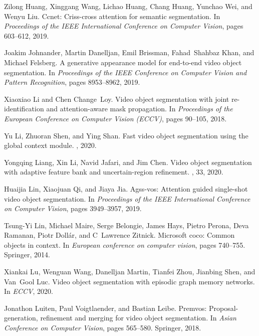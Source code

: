 \documentclass[final]{cvpr}
\begin{document}
{\begin{thebibliography}{10}
Zilong Huang, Xinggang Wang, Lichao Huang, Chang Huang, Yunchao Wei, and Wenyu
  Liu.
\newblock Ccnet: Criss-cross attention for semantic segmentation.
\newblock In {\em Proceedings of the IEEE International Conference on Computer
  Vision}, pages 603--612, 2019.

Joakim Johnander, Martin Danelljan, Emil Brissman, Fahad~Shahbaz Khan, and
  Michael Felsberg.
\newblock A generative appearance model for end-to-end video object
  segmentation.
\newblock In {\em Proceedings of the IEEE Conference on Computer Vision and
  Pattern Recognition}, pages 8953--8962, 2019.

Xiaoxiao Li and Chen Change~Loy.
\newblock Video object segmentation with joint re-identification and
  attention-aware mask propagation.
\newblock In {\em Proceedings of the European Conference on Computer Vision
  (ECCV)}, pages 90--105, 2018.

Yu Li, Zhuoran Shen, and Ying Shan.
\newblock Fast video object segmentation using the global context module.
, 2020.

Yongqing Liang, Xin Li, Navid Jafari, and Jim Chen.
\newblock Video object segmentation with adaptive feature bank and
  uncertain-region refinement.
, 33, 2020.

Huaijia Lin, Xiaojuan Qi, and Jiaya Jia.
\newblock Agss-vos: Attention guided single-shot video object segmentation.
\newblock In {\em Proceedings of the IEEE International Conference on Computer
  Vision}, pages 3949--3957, 2019.

Tsung-Yi Lin, Michael Maire, Serge Belongie, James Hays, Pietro Perona, Deva
  Ramanan, Piotr Doll{\'a}r, and C~Lawrence Zitnick.
\newblock Microsoft coco: Common objects in context.
\newblock In {\em European conference on computer vision}, pages 740--755.
  Springer, 2014.

Xiankai Lu, Wenguan Wang, Danelljan Martin, Tianfei Zhou, Jianbing Shen, and
  Van~Gool Luc.
\newblock Video object segmentation with episodic graph memory networks.
\newblock In {\em ECCV}, 2020.

Jonathon Luiten, Paul Voigtlaender, and Bastian Leibe.
\newblock Premvos: Proposal-generation, refinement and merging for video object
  segmentation.
\newblock In {\em Asian Conference on Computer Vision}, pages 565--580.
  Springer, 2018.


\end{thebibliography}}
\end{document}
